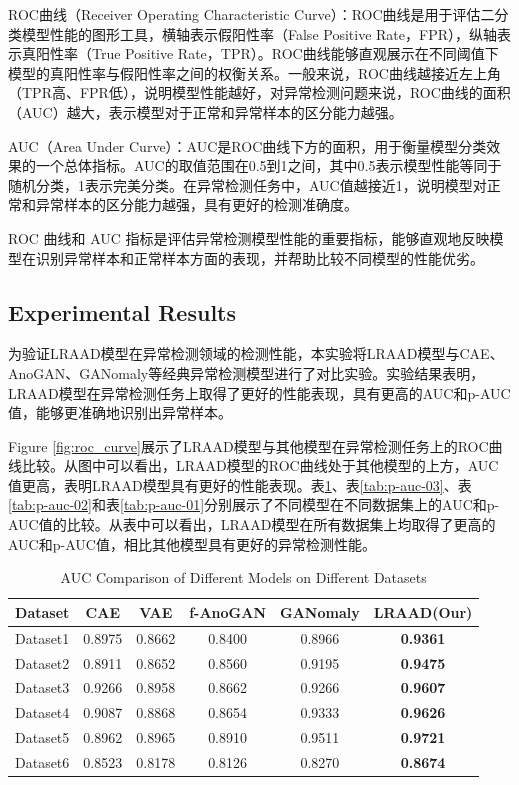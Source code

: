 \documentclass{article}
\begin{document}
ROC曲线（Receiver Operating Characteristic Curve）：ROC曲线是用于评估二分类模型性能的图形工具，横轴表示假阳性率（False Positive Rate，FPR），纵轴表示真阳性率（True Positive Rate，TPR）。ROC曲线能够直观展示在不同阈值下模型的真阳性率与假阳性率之间的权衡关系。一般来说，ROC曲线越接近左上角（TPR高、FPR低），说明模型性能越好，对异常检测问题来说，ROC曲线的面积（AUC）越大，表示模型对于正常和异常样本的区分能力越强。

AUC（Area Under Curve）：AUC是ROC曲线下方的面积，用于衡量模型分类效果的一个总体指标。AUC的取值范围在0.5到1之间，其中0.5表示模型性能等同于随机分类，1表示完美分类。在异常检测任务中，AUC值越接近1，说明模型对正常和异常样本的区分能力越强，具有更好的检测准确度。

ROC 曲线和 AUC 指标是评估异常检测模型性能的重要指标，能够直观地反映模型在识别异常样本和正常样本方面的表现，并帮助比较不同模型的性能优劣。

\subsection{Experimental Results}
为验证LRAAD模型在异常检测领域的检测性能，本实验将LRAAD模型与CAE、AnoGAN、GANomaly等经典异常检测模型进行了对比实验。实验结果表明，LRAAD模型在异常检测任务上取得了更好的性能表现，具有更高的AUC和p-AUC值，能够更准确地识别出异常样本。

Figure \ref{fig:roc_curve}展示了LRAAD模型与其他模型在异常检测任务上的ROC曲线比较。从图中可以看出，LRAAD模型的ROC曲线处于其他模型的上方，AUC值更高，表明LRAAD模型具有更好的性能表现。表\ref{tab:auc}、表\ref{tab:p-auc-03}、表\ref{tab:p-auc-02}和表\ref{tab:p-auc-01}分别展示了不同模型在不同数据集上的AUC和p-AUC值的比较。从表中可以看出，LRAAD模型在所有数据集上均取得了更高的AUC和p-AUC值，相比其他模型具有更好的异常检测性能。

\begin{table}[H]
    \centering
    \begin{tabular}{cccccc}
        \toprule
        Dataset & CAE & VAE & f-AnoGAN & GANomaly & LRAAD(Our) \\
        \midrule
        Dataset1 & 0.8975 & 0.8662 & 0.8400 & 0.8966 & \textbf{0.9361} \\
        Dataset2 & 0.8911 & 0.8652 & 0.8560 & 0.9195 & \textbf{0.9475} \\
        Dataset3 & 0.9266 & 0.8958 & 0.8662 & 0.9266 & \textbf{0.9607} \\
        Dataset4 & 0.9087 & 0.8868 & 0.8654 & 0.9333 & \textbf{0.9626} \\
        Dataset5 & 0.8962 & 0.8965 & 0.8910 & 0.9511 & \textbf{0.9721} \\
        Dataset6 & 0.8523 & 0.8178 & 0.8126 & 0.8270 & \textbf{0.8674} \\
        \bottomrule
    \end{tabular}
    \caption{AUC Comparison of Different Models on Different Datasets}
    \label{tab:auc}
\end{table}
\end{document}
